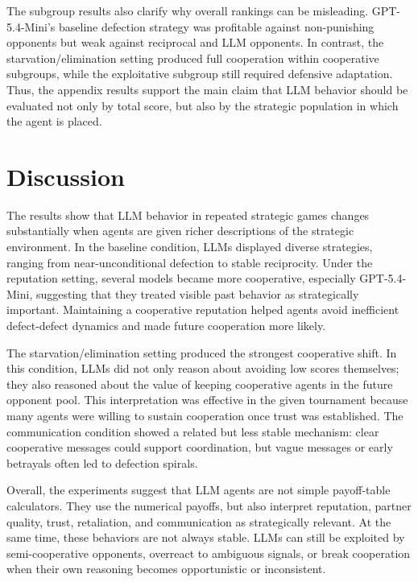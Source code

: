 \documentclass[11pt]{article}
\begin{document}
The subgroup results also clarify why overall rankings can be misleading. GPT-5.4-Mini's baseline defection strategy was profitable against non-punishing opponents but weak against reciprocal and LLM opponents. In contrast, the starvation/elimination setting produced full cooperation within cooperative subgroups, while the exploitative subgroup still required defensive adaptation. Thus, the appendix results support the main claim that LLM behavior should be evaluated not only by total score, but also by the strategic population in which the agent is placed.

\section{Discussion}

The results show that LLM behavior in repeated strategic games changes substantially when agents are given richer descriptions of the strategic environment. In the baseline condition, LLMs displayed diverse strategies, ranging from near-unconditional defection to stable reciprocity. Under the reputation setting, several models became more cooperative, especially GPT-5.4-Mini, suggesting that they treated visible past behavior as strategically important. Maintaining a cooperative reputation helped agents avoid inefficient defect-defect dynamics and made future cooperation more likely.

The starvation/elimination setting produced the strongest cooperative shift. In this condition, LLMs did not only reason about avoiding low scores themselves; they also reasoned about the value of keeping cooperative agents in the future opponent pool. This interpretation was effective in the given tournament because many agents were willing to sustain cooperation once trust was established. The communication condition showed a related but less stable mechanism: clear cooperative messages could support coordination, but vague messages or early betrayals often led to defection spirals.

Overall, the experiments suggest that LLM agents are not simple payoff-table calculators. They use the numerical payoffs, but also interpret reputation, partner quality, trust, retaliation, and communication as strategically relevant. At the same time, these behaviors are not always stable. LLMs can still be exploited by semi-cooperative opponents, overreact to ambiguous signals, or break cooperation when their own reasoning becomes opportunistic or inconsistent.
\end{document}
